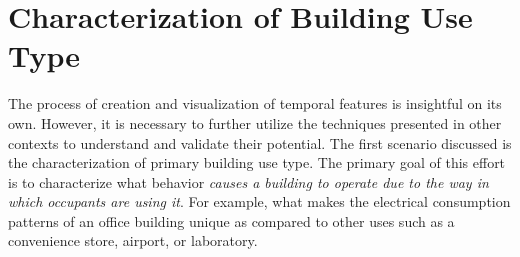 \section{Characterization of Building Use Type}
\label{sec:results_usetype}

The process of creation and visualization of temporal features is insightful on its own. However, it is necessary to further utilize the techniques presented in other contexts to understand and validate their potential. The first scenario discussed is the characterization of primary building use type. The primary goal of this effort is to characterize what behavior \emph{causes a building to operate due to the way in which occupants are using it}. For example, what makes the electrical consumption patterns of an office building unique as compared to other uses such as a convenience store, airport, or laboratory.